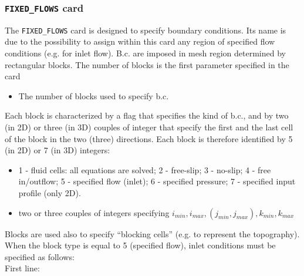 \subsubsection{{\tt FIXED\_FLOWS} card}

The {\tt FIXED\_FLOWS} card is designed to specify boundary conditions. Its
name is due to the possibility to assign within this card any region of
specified flow conditions (e.g. for inlet flow). B.c. are imposed in 
mesh region determined by rectangular blocks. The number of blocks is the
first parameter specified in the card

\begin{itemize}
\item
{}
{The number of blocks used to specify b.c.}
\end{itemize}

Each block is characterized
by a flag that specifies the kind of b.c., and by two (in 2D) or three (in 3D)
couples of integer that specify the first and the last cell of the block in 
the two (three) directions. Each block is therefore identified by 5 (in 2D)
or 7 (in 3D) integers:\\

\begin{itemize}
\item
{}
{1 - fluid cells: all equations are solved; 2 - free-slip;
 3 - no-slip; 4 - free in/outflow; 5 - specified flow (inlet); 
 6 - specified pressure; 7 - specified input profile (only 2D).}

\item
{}
{two or three couples of integers specifying 
$ i_{min}, i_{max}, (j_{min}, j_{max}), k_{min}, k_{max}$ }

\end{itemize}

Blocks are used also to specify ``blocking cells'' (e.g. to 
represent the topography). When the block type is equal to 5 (specified
flow), inlet conditions must be specified as follows:\\

First line:


